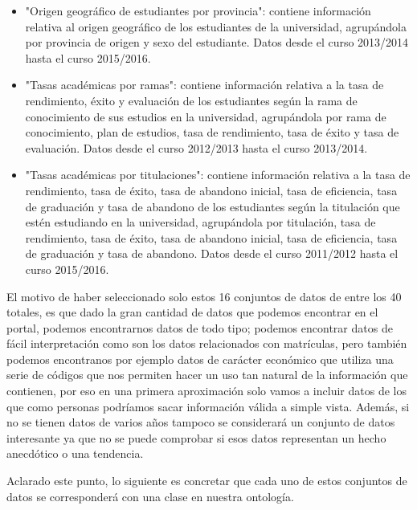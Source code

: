 \begin{itemize}
	\item "Origen geográfico de estudiantes por provincia": contiene información relativa al origen geográfico de los estudiantes de la universidad, agrupándola por provincia de origen y sexo del estudiante. Datos desde el curso 2013/2014 hasta el curso 2015/2016.
	\item "Tasas académicas por ramas": contiene información relativa a la tasa de rendimiento, éxito y evaluación de los estudiantes según la rama de conocimiento de sus estudios en la universidad, agrupándola por rama de conocimiento, plan de estudios, tasa de rendimiento, tasa de éxito y tasa de evaluación. Datos desde el curso 2012/2013 hasta el curso 2013/2014.
	\item "Tasas académicas por titulaciones": contiene información relativa a la tasa de rendimiento, tasa de éxito, tasa de abandono inicial, tasa de eficiencia, tasa de graduación y tasa de abandono de los estudiantes según la titulación que estén estudiando en la universidad, agrupándola por titulación, tasa de rendimiento, tasa de éxito, tasa de abandono inicial, tasa de eficiencia, tasa de graduación y tasa de abandono. Datos desde el curso 2011/2012 hasta el curso 2015/2016.
\end{itemize}

El motivo de haber seleccionado solo estos 16 conjuntos de datos de entre los 40 totales, es que dado la gran cantidad de datos que podemos encontrar en el portal, podemos encontrarnos datos de todo tipo; podemos encontrar datos de fácil interpretación como son los datos relacionados con matrículas, pero también podemos encontranos por ejemplo datos de carácter económico que utiliza una serie de códigos que nos permiten hacer un uso tan natural de la información que contienen, por eso en una primera aproximación solo vamos a incluir datos de los que como personas podríamos sacar información válida a simple vista. Además, si no se tienen datos de varios años tampoco se considerará un conjunto de datos interesante ya que no se puede comprobar si esos datos representan un hecho anecdótico o una tendencia.

\bigskip

Aclarado este punto, lo siguiente es concretar que cada uno de estos conjuntos de datos se corresponderá con una clase en nuestra ontología.

